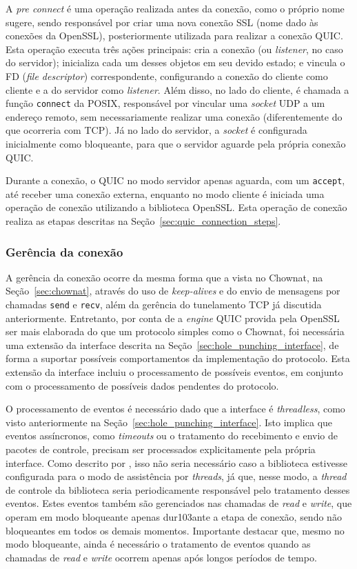 A \textit{pre connect} é uma operação realizada antes da conexão, como o próprio nome sugere, sendo responsável por criar uma nova conexão SSL (nome dado às conexões da OpenSSL), posteriormente utilizada para realizar a conexão QUIC. Esta operação executa três ações principais: cria a conexão (ou \textit{listener}, no caso do servidor); inicializa cada um desses objetos em seu devido estado; e vincula o FD (\textit{file descriptor}) correspondente, configurando a conexão do cliente como cliente e a do servidor como \textit{listener}. Além disso, no lado do cliente, é chamada a função \texttt{connect} da POSIX, responsável por vincular uma \textit{socket} UDP a um endereço remoto, sem necessariamente realizar uma conexão (diferentemente do que ocorreria com TCP). Já no lado do servidor, a \textit{socket} é configurada inicialmente como bloqueante, para que o servidor aguarde pela própria conexão QUIC.

Durante a conexão, o QUIC no modo servidor apenas aguarda, com um \texttt{accept}, até receber uma conexão externa, enquanto no modo cliente é iniciada uma operação de conexão utilizando a biblioteca OpenSSL. Esta operação de conexão realiza as etapas descritas na Seção~\ref{sec:quic_connection_steps}.

\subsubsection{Gerência da conexão}

A gerência da conexão ocorre da mesma forma que a vista no Chownat, na Seção~\ref{sec:chownat}, através do uso de \textit{keep-alives} e do envio de mensagens por chamadas \texttt{send} e \texttt{recv}, além da gerência do tunelamento TCP já discutida anteriormente. Entretanto, por conta de a \textit{engine} QUIC provida pela OpenSSL ser mais elaborada do que um protocolo simples como o Chownat, foi necessária uma extensão da interface descrita na Seção~\ref{sec:hole_punching_interface}, de forma a suportar possíveis comportamentos da implementação do protocolo. Esta extensão da interface incluiu o processamento de possíveis eventos, em conjunto com o processamento de possíveis dados pendentes do protocolo.

O processamento de eventos é necessário dado que a interface é \textit{threadless}, como visto anteriormente na Seção~\ref{sec:hole_punching_interface}. Isto implica que eventos assíncronos, como \textit{timeouts} ou o tratamento do recebimento e envio de pacotes de controle, precisam ser processados explicitamente pela própria interface. Como descrito por \citep{openssl_ssl_handle_events}, isso não seria necessário caso a biblioteca estivesse configurada para o modo de assistência por \textit{threads}, já que, nesse modo, a \textit{thread} de controle da biblioteca seria periodicamente responsável pelo tratamento desses eventos. Estes eventos também são gerenciados nas chamadas de \textit{read} e \textit{write}, que operam em modo bloqueante apenas dur103ante a etapa de conexão, sendo não bloqueantes em todos os demais momentos. Importante destacar que, mesmo no modo bloqueante, ainda é necessário o tratamento de eventos quando as chamadas de \textit{read} e \textit{write} ocorrem apenas após longos períodos de tempo.

